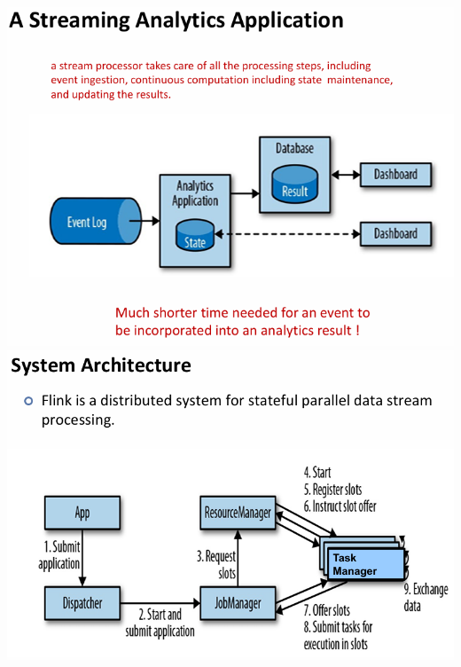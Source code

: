 \documentclass[10pt, landscape]{article}
\begin{document}
\begin{multicols*}{4}
  \includegraphics[width=0.95\linewidth]{streaming_analytics_application.png}
  \includegraphics[width=0.95\linewidth]{flink_sys_architecture.png}


\end{multicols*}
\end{document}
